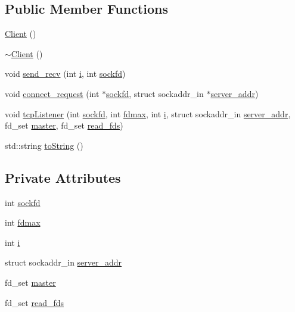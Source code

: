 \subsection*{Public Member Functions}
\begin{DoxyCompactItemize}
\item 
\hyperlink{class_client_ae51af7aa6b8f591496a8f6a4a87a14bf}{Client} ()
\item 
\hyperlink{class_client_a840e519ca781888cbd54181572ebe3a7}{$\sim$\+Client} ()
\item 
void \hyperlink{class_client_a7d7ba78b63357fe2c7566018e30e9767}{send\+\_\+recv} (int \hyperlink{class_client_a8086f64d20f268817ef23bc81cbea059}{i}, int \hyperlink{class_client_ab0cf9b759ba4da79ccb0a64242d944c4}{sockfd})
\item 
void \hyperlink{class_client_a63a0074432524094592cc95ec3b8c31c}{connect\+\_\+request} (int $\ast$\hyperlink{class_client_ab0cf9b759ba4da79ccb0a64242d944c4}{sockfd}, struct sockaddr\+\_\+in $\ast$\hyperlink{class_client_a3787f155329f63a3bae120e9deca92d6}{server\+\_\+addr})
\item 
void \hyperlink{class_client_a3e98bb9f68d2fc456e772bb88df85374}{tcp\+Listener} (int \hyperlink{class_client_ab0cf9b759ba4da79ccb0a64242d944c4}{sockfd}, int \hyperlink{class_client_a99ae6181165c7b5119a4c93f3b1908c8}{fdmax}, int \hyperlink{class_client_a8086f64d20f268817ef23bc81cbea059}{i}, struct sockaddr\+\_\+in \hyperlink{class_client_a3787f155329f63a3bae120e9deca92d6}{server\+\_\+addr}, fd\+\_\+set \hyperlink{class_client_a56c611a99e0ba2a2efaddeb9ae021618}{master}, fd\+\_\+set \hyperlink{class_client_a3631a848d923649af981576df2c83506}{read\+\_\+fds})
\item 
std\+::string \hyperlink{class_client_a3e81863ee34feda7aada5e4f12e5b702}{to\+String} ()
\end{DoxyCompactItemize}
\subsection*{Private Attributes}
\begin{DoxyCompactItemize}
\item 
int \hyperlink{class_client_ab0cf9b759ba4da79ccb0a64242d944c4}{sockfd}
\item 
int \hyperlink{class_client_a99ae6181165c7b5119a4c93f3b1908c8}{fdmax}
\item 
int \hyperlink{class_client_a8086f64d20f268817ef23bc81cbea059}{i}
\item 
struct sockaddr\+\_\+in \hyperlink{class_client_a3787f155329f63a3bae120e9deca92d6}{server\+\_\+addr}
\item 
fd\+\_\+set \hyperlink{class_client_a56c611a99e0ba2a2efaddeb9ae021618}{master}
\item 
fd\+\_\+set \hyperlink{class_client_a3631a848d923649af981576df2c83506}{read\+\_\+fds}
\end{DoxyCompactItemize}


